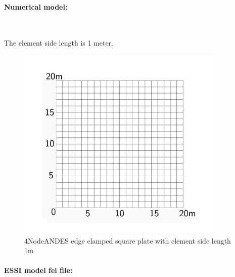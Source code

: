 \clearpage
\paragraph{Numerical model:} ~

The element side length is 1 meter. 


\begin{figure}[!htb]
  \centering
  \includegraphics[width=10cm]{./Figure-files/_Chapter_Appendix_Illustrative_Examples/square_plate4_2.pdf}
  \caption{4NodeANDES edge clamped square plate with element side length 1m }
  \label{fig 4NodeANDES edges clamped square plate with element side length 1m }
\end{figure}


\paragraph{ESSI model fei file: } ~


